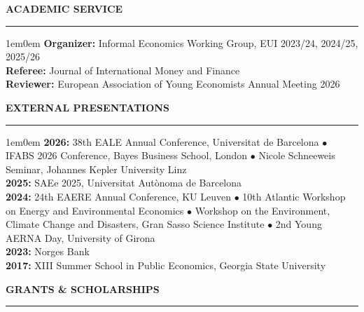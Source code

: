 \documentclass[12pt]{article}
\begin{document}

\vspace{0.5em} %
\noindent\textbf{ACADEMIC SERVICE}\\
\noindent\rule[8pt]{\textwidth}{0.5pt}

\begin{adjustwidth}{1em}{0em}
\textbf{Organizer:} Informal Economics Working Group, EUI \hfill 2023/24, 2024/25, 2025/26\\
\textbf{Referee:} Journal of International Money and Finance\\
\textbf{Reviewer:} European Association of Young Economists Annual Meeting 2026
\end{adjustwidth}




\vspace{0.5em} %
\noindent\textbf{EXTERNAL PRESENTATIONS}\\
\noindent\rule[8pt]{\textwidth}{0.5pt}


\begin{adjustwidth}{1em}{0em}
\textbf{2026:} 38th EALE Annual Conference, Universitat de Barcelona $\bullet$ IFABS 2026 Conference, Bayes Business School, London $\bullet$ Nicole Schneeweis Seminar, Johannes Kepler University Linz \\
\textbf{2025:} SAEe 2025, Universitat Autònoma de Barcelona \\
\textbf{2024:} 24th EAERE Annual Conference, KU Leuven $\bullet$ 10th Atlantic Workshop on Energy and Environmental Economics $\bullet$ Workshop on the Environment, Climate Change and Disasters, Gran Sasso Science Institute $\bullet$ 2nd Young AERNA Day, University of Girona\\
\textbf{2023:} Norges Bank\\
\textbf{2017:} XIII Summer School in Public Economics, Georgia State University\\

\end{adjustwidth}

\noindent \textbf{GRANTS \& SCHOLARSHIPS}\\
\noindent\rule[8pt]{\textwidth}{0.5pt}
\end{document}
